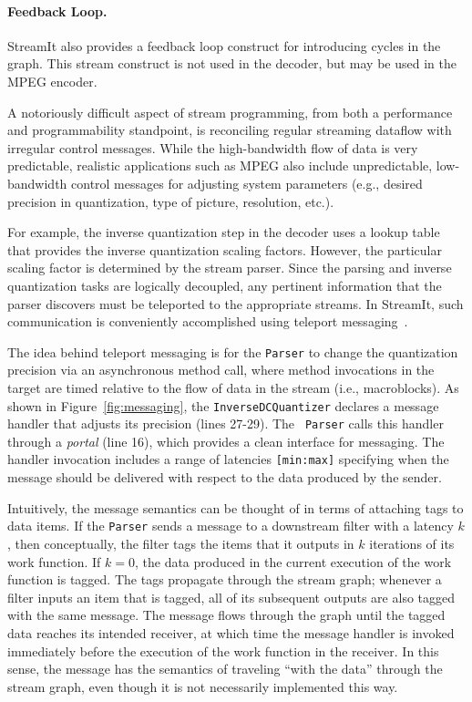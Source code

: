 \paragraph{Feedback Loop.}
StreamIt also provides a feedback loop construct for introducing
cycles in the graph. This stream construct is not used in the decoder,
but may be used in the MPEG encoder.

\label{sec:messaging}
A notoriously difficult aspect of stream programming, from both a
performance and programmability standpoint, is reconciling regular
streaming dataflow with irregular control messages.  While the
high-bandwidth flow of data is very predictable, realistic
applications such as MPEG also include unpredictable, low-bandwidth
control messages for adjusting system parameters (e.g., desired
precision in quantization, type of picture, resolution, etc.).

For example, the inverse quantization step in the decoder uses a
lookup table that provides the inverse quantization scaling factors.
However, the particular scaling factor is determined by the stream
parser. Since the parsing and inverse quantization tasks are logically
decoupled, any pertinent information that the parser discovers must be
teleported to the appropriate streams.  In StreamIt, such
communication is conveniently accomplished using teleport
messaging~\cite{thies05ppopp}.

The idea behind teleport messaging is for the {\tt Parser} to change
the quantization precision via an asynchronous method call, where
method invocations in the target are timed relative to the flow of
data in the stream (i.e., macroblocks). As shown in
Figure~\ref{fig:messaging}, the {\tt InverseDCQuantizer} declares a
message handler that adjusts its precision (lines 27-29). The {\tt
Parser} calls this handler through a {\it portal} (line 16), which
provides a clean interface for messaging.  The handler invocation
includes a range of latencies {\tt [min:max]} specifying when the
message should be delivered with respect to the data produced by the
sender.

Intuitively, the message semantics can be thought of in terms of
attaching tags to data items.  If the {\tt Parser} sends a message to
a downstream filter with a latency $k$, then conceptually, the filter
tags the items that it outputs in $k$ iterations of its work
function. If $k=0$, the data produced in the current execution of the
work function is tagged. The tags propagate through the stream graph;
whenever a filter inputs an item that is tagged, all of its subsequent
outputs are also tagged with the same message. The message flows
through the graph until the tagged data reaches its intended receiver,
at which time the message handler is invoked immediately before the
execution of the work function in the receiver.  In this sense, the
message has the semantics of traveling ``with the data'' through the
stream graph, even though it is not necessarily implemented this way.

